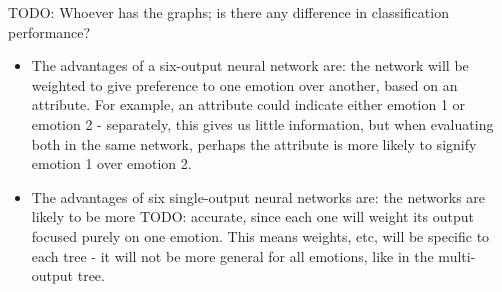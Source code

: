 \documentclass[12pt]{article}
\begin{document}
TODO: Whoever has the graphs; is there any difference in classification performance? \\
\begin{itemize}
  \item The advantages of a six-output neural network are: the network will be weighted to give preference to one emotion over another, based on an attribute. For example, an attribute could indicate either emotion 1 or emotion 2 - separately, this gives us little information, but when evaluating both in the same network, perhaps the attribute is more likely to signify emotion 1 over emotion 2.
  \item The advantages of six single-output neural networks are: the networks are likely to be more TODO: accurate, since each one will weight its output focused purely on one emotion. This means weights, etc, will be specific to each tree - it will not be more general for all emotions, like in the multi-output tree.
\end{itemize}
\end{document}
